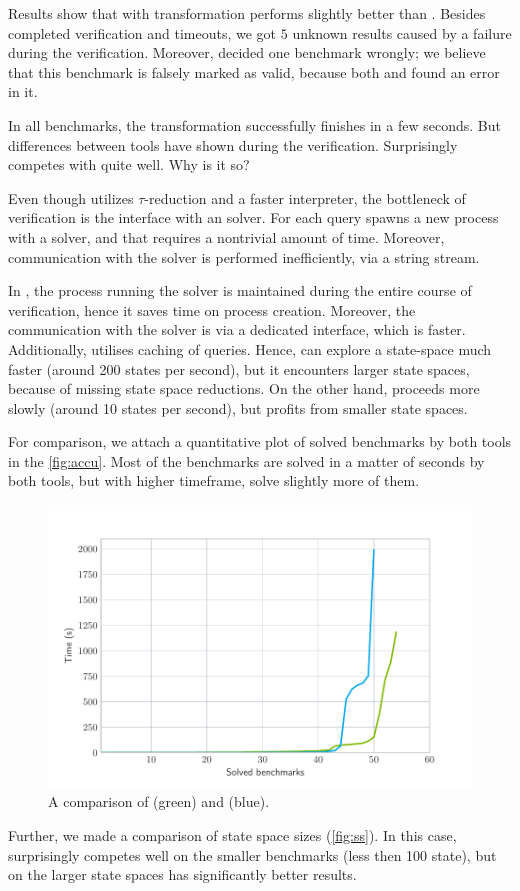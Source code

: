 Results show that \DIVINE with transformation performs slightly better than
\SymDIVINE. Besides completed verification and timeouts, we got $5$ unknown
results caused by a failure during the verification. Moreover, \DIVINE decided
one benchmark wrongly; we believe that this benchmark is falsely marked as
valid, because both \SymDIVINE and \DIVINE found an error in it.

In all benchmarks, the transformation successfully finishes in a few seconds.
But differences between tools have shown during the verification. Surprisingly
\SymDIVINE competes with \DIVINE quite well. Why is it so?

Even though \DIVINE utilizes $\tau$-reduction and a faster \LLVM interpreter,
the bottleneck of verification is the interface with an \SMT solver. For each
\SMT query \DIVINE spawns a new process with a solver, and that requires a nontrivial amount of time. Moreover, communication with the solver is
performed inefficiently, via a string stream.

In \SymDIVINE, the process running the \SMT solver is maintained during the
entire course of verification, hence it saves time on process creation.
Moreover, the communication with the solver is via a dedicated interface,
which is faster. Additionally, \SymDIVINE utilises caching of queries.
Hence, \SymDIVINE can explore a state-space much faster (around 200 states
per second), but it encounters larger state spaces, because of missing state
space reductions. On the other hand, \DIVINE proceeds more slowly (around 10
states per second), but profits from smaller state spaces.

For comparison, we attach a quantitative plot of solved benchmarks by both tools
in the \autoref{fig:accu}.
Most of the benchmarks are solved in a matter of seconds by both tools, but with
higher timeframe, \DIVINE solve slightly more of them.

\begin{figure}
\includegraphics[width=\textwidth]{img/accum.pdf}
    \caption{A comparison of \DIVINE (green) and \SymDIVINE (blue).}
    \label{fig:accu}
\end{figure}
Further, we made a comparison of state space sizes (\autoref{fig:ss}). In this case, \SymDIVINE
surprisingly competes well on the smaller benchmarks (less then 100 state), but
on the larger state spaces \DIVINE has significantly better results.

